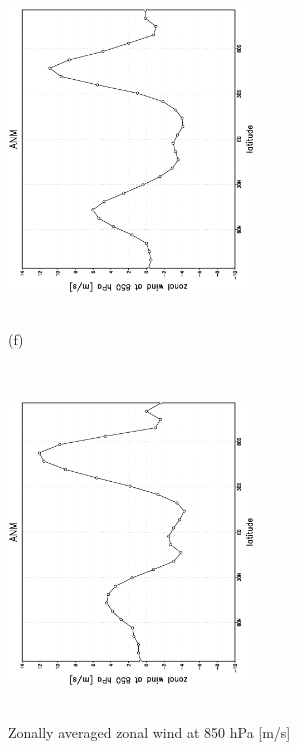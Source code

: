 \documentclass[12pt,a4paper,twoside,openright,headinclude,liststotoc,bibtotoc]{scrreprt}
\begin{document}
\begin{appendix}
\begin{figure}[c]
{\includegraphics[height=8.5cm,width=6.5cm,angle=-90]
{eps/zontmu_850.eps}
}
\parbox{8.5cm}{\hspace{0.80cm} \begin{scriptsize}(f) \end{scriptsize} \vspace{-0.5cm} \\
\includegraphics[height=8.5cm,width=6.5cm,angle=-90]
{eps/t21zontmuvel131850.eps}
}
\caption[Zonally averaged zonal wind at 850 hPa]{Zonally averaged zonal wind at 850 hPa [m/s]}
\label{img:uzon850}
\end{figure}

\newpage


\end{appendix}
\end{document}
